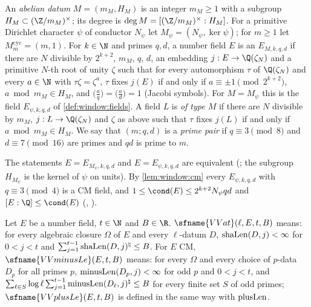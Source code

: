\begin{definition}\label{pf:vwin:fields}
An \emph{abelian datum} $M=(m_M,H_M)$ is an integer $m_M\ge1$ with a subgroup $H_M\subset(\Z/m_M)^\times$; its degree is
$\deg M=[(\Z/m_M)^\times:H_M]$. For a primitive Dirichlet character $\psi$ of conductor $N_\psi$ let
$M_\psi=(N_\psi,\ker\psi)$; for $m\ge1$ let $M^{\mathrm{cyc}}_m=(m,1)$. For $k\in\N$ and primes $q,d$, a number field $E$ is
an \emph{$E_{M,k,q,d}$} if there are $N$ divisible by $2^{k+2}$, $m_M$, $q$, $d$, an embedding $j:E\to\Q(\zeta_N)$ and
a primitive $N$-th root of unity $\zeta$ such that for every automorphism $\tau$ of $\Q(\zeta_N)$ and every $a\in\N$
with $\tau\zeta=\zeta^a$, $\tau$ fixes $j(E)$ if and only if $a\equiv\pm1\pmod{2^{k+2}}$, $a\bmod m_M\in H_M$, and
$\bigl(\frac aq\bigr)=\bigl(\frac ad\bigr)=1$ (Jacobi symbols). For $M=M_\psi$ this is the field $E_{\psi,k,q,d}$ of
\cref{def:window:fields}. A field $L$ is \emph{of type $M$} if there are $N$ divisible by $m_M$, $j:L\to\Q(\zeta_N)$ and
$\zeta$ as above such that $\tau$ fixes $j(L)$ if and only if $a\bmod m_M\in H_M$. We say that $(m;q,d)$ is a
\emph{prime pair} if $q\equiv3\pmod8$ and $d\equiv7\pmod{16}$ are
primes and $qd$ is prime to $m$.
\end{definition}

The statements $E=E_{M_\psi,k,q,d}$ and $E=E_{\psi,k,q,d}$ are equivalent
(; the subgroup $H_{M_\psi}$ is the kernel of $\psi$ on units). By
\cref{lem:window:cm} every $E_{\psi,k,q,d}$ with $q\equiv3\pmod4$ is a CM field, and $1\le\cond(E)\le2^{k+2}N_\psi qd$
and $[E:\Q]\le\cond(E)$ (,
).

\begin{definition}\label{pf:vwin:partial}
Let $E$ be a number field, $t\in\N$ and $B\in\R$. $\sfname{VVat}(\ell,E,t,B)$ means: for every algebraic closure
$\Omega$ of $E$ and every $\ell$-datum $D$, $\mathrm{shaLen}(D,j)<\infty$ for $0<j<t$ and
$\sum_{j=1}^{t-1}\mathrm{shaLen}(D,j)^\natural\le B$. For $E$ CM, $\sfname{VVminusLe}(E,t,B)$ means: for every $\Omega$ and every
choice of $p$-data $D_p$ for all primes $p$, $\mathrm{minusLen}(D_p,j)<\infty$ for odd $p$ and $0<j<t$, and
$\sum_{\ell\in S}\log\ell\sum_{j=1}^{t-1}\mathrm{minusLen}(D_\ell,j)^\natural\le B$ for every finite set $S$ of odd primes;
$\sfname{VVplusLe}(E,t,B)$ is defined in the same way with $\mathrm{plusLen}$.
\end{definition}

